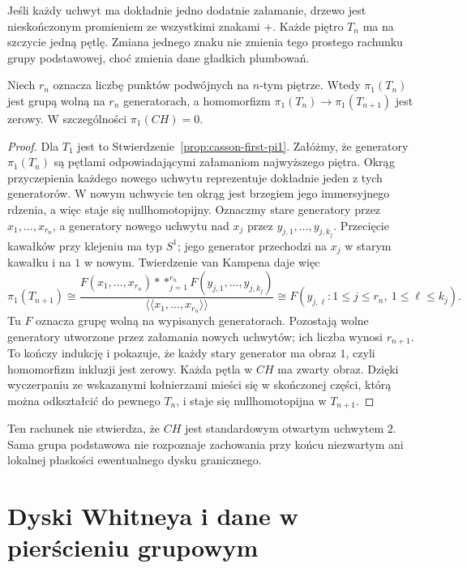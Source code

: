 \begin{przyklad}
\label{prz:casson-ray}
Jeśli każdy uchwyt ma dokładnie jedno dodatnie
załamanie, drzewo jest nieskończonym promieniem
ze wszystkimi znakami $+$. Każde piętro $T_n$
ma na szczycie jedną pętlę. Zmiana jednego znaku
nie zmienia tego prostego rachunku grupy podstawowej,
choć zmienia dane gładkich plumbowań.
\end{przyklad}

\begin{stwierdzenie}
\label{prop:casson-tower-pi1}
Niech $r_n$ oznacza liczbę punktów podwójnych
na $n$-tym piętrze. Wtedy
$\pi_1(T_n)$ jest grupą wolną na $r_n$ generatorach,
a homomorfizm
$\pi_1(T_n)\to\pi_1(T_{n+1})$ jest zerowy.
W szczególności $\pi_1(CH)=0$.
\end{stwierdzenie}
\begin{proof}
Dla $T_1$ jest to
Stwierdzenie~\ref{prop:casson-first-pi1}.
Załóżmy, że generatory $\pi_1(T_n)$ są pętlami
odpowiadającymi załamaniom najwyższego piętra.
Okrąg przyczepienia każdego nowego uchwytu
reprezentuje dokładnie jeden z tych generatorów.
W nowym uchwycie ten okrąg jest brzegiem jego
immersyjnego rdzenia, a więc staje się
nullhomotopijny. Oznaczmy stare generatory przez
$x_1,\ldots,x_{r_n}$, a generatory nowego uchwytu nad
$x_j$ przez $y_{j,1},\ldots,y_{j,k_j}$.
Przecięcie kawałków przy klejeniu ma typ $S^1$;
jego generator przechodzi na $x_j$ w starym kawałku
i na $1$ w nowym. Twierdzenie van Kampena daje więc
\[
 \pi_1(T_{n+1})\cong
 \frac{F(x_1,\ldots,x_{r_n})*
             \mathop{\ast}_{j=1}^{r_n}F(y_{j,1},\ldots,y_{j,k_j})}
      {\langle\!\langle x_1,\ldots,x_{r_n}\rangle\!\rangle}
 \cong F(y_{j,\ell}:1\leq j\leq r_n,\ 1\leq\ell\leq k_j).
\]
Tu $F$ oznacza grupę wolną na wypisanych generatorach.
Pozostają wolne
generatory utworzone przez załamania nowych
uchwytów; ich liczba wynosi $r_{n+1}$.
To kończy indukcję i pokazuje, że każdy stary generator
ma obraz $1$, czyli homomorfizm inkluzji jest zerowy.
Każda pętla w $CH$ ma zwarty obraz. Dzięki wyczerpaniu
ze wskazanymi kołnierzami mieści się w skończonej
części, którą można odkształcić do pewnego $T_n$, i staje się
nullhomotopijna w $T_{n+1}$.
\end{proof}

Ten rachunek nie stwierdza, że $CH$ jest standardowym
otwartym uchwytem $2$. Sama grupa podstawowa nie
rozpoznaje zachowania przy końcu niezwartym ani
lokalnej płaskości ewentualnego dysku granicznego.

\section{Dyski Whitneya i dane w pierścieniu grupowym}
\label{sec:casson-whitney}


